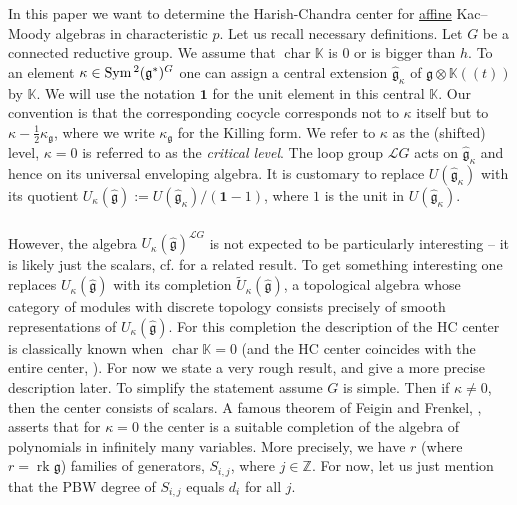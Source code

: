 \documentclass{amsart}
\theoremstyle{definition}
\newcommand{\sss}{\subsubsection{}}
\newcommand{\Sym}{\on{Sym}\hspace{.5mm}}
\newcommand{\on}{\mathrm}
\newcommand{\g}{\mathfrak{g}}
\newcommand{\hg}{\hat{\mathfrak{g}}}
\newcommand{\Z}{\mathbb{Z}}
\newcommand{\Loop}{\mathscr{L}}
\newcommand{\bK}{\mathbb{K}}
\renewcommand{\bK}{\mathbb{K}} %
\numberwithin{equation}{section}
\begin{document}
\sss  
In this paper we want to determine the Harish-Chandra center for \underline{affine} Kac--Moody algebras in characteristic $p$. Let us recall necessary definitions. Let $G$ be a connected reductive group.
We assume that $\operatorname{char}\bK$ is $0$ or is bigger than $h$. To an element $\kappa\in \Sym^2(\g^*)^G$ one can assign a
central extension $\hat{\g}_\kappa$ of $\g\otimes \bK(\!(t)\!)$ by $\bK$.
We will use the notation $\mathbf{1}$ for the unit element in this central $\bK$.
Our convention is that the corresponding cocycle corresponds not to $\kappa$ itself but to $\kappa-\frac{1}{2}\kappa_\g$, where we write $\kappa_\g$ for the Killing form. We refer to $\kappa$ as the (shifted) level, $\kappa=0$ is referred to as the {\it critical level}. The loop group $\Loop G$ acts on $\hat{\g}_\kappa$ and hence on its universal enveloping algebra. It is customary to replace $U(\hat{\g}_\kappa)$ with its quotient $U_\kappa(\hg):=U(\hg_\kappa)/(\mathbf{1}-1)$, where $1$ is the unit in $U(\hg_\kappa)$.

\sss\label{SSS_FF_Thm_intro}
However, the algebra $U_\kappa(\hg)^{\Loop G}$ is not expected to be particularly interesting -- it is likely just the scalars, cf. 
\cite{YZ} for a related result. To get something interesting one replaces $U_\kappa(\hg)$ with its completion $\widetilde{U}_\kappa(\hg)$, a topological algebra whose category of modules with discrete topology consists precisely of smooth representations of $U_\kappa(\hg)$. For this completion the description of the HC center is classically known when $\operatorname{char}\bK=0$ (and the HC center coincides with the entire center, \cite[Proposition 4.3.8]{Frenkel_loop}). 
For now we state a very rough result, and give a more precise description later. To simplify the statement assume $G$ is simple. 
Then if $\kappa\neq 0$, then the center consists of scalars. 
A famous theorem of Feigin and Frenkel, \cite{FF91}, asserts that for $\kappa=0$ the center is a suitable completion of the algebra of polynomials in infinitely many variables.  More precisely, we have $r$ (where $r=\operatorname{rk}\g$) families of generators, $S_{i,j}$, where $j\in \Z$. For now, let us just mention that the PBW degree of $S_{i,j}$ equals $d_i$ for all $j$. 
\end{document}
